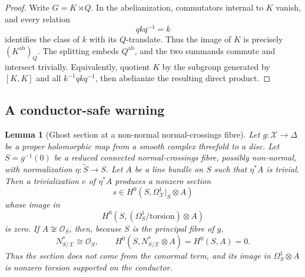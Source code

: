 \documentclass[11pt,reqno]{amsart}
\numberwithin{equation}{section}
\newtheorem{lemma}[lemma]{Lemma}
\theoremstyle{definition}
\begin{document}
\begin{proof}
Write $G=K\rtimes Q$. In the abelianization, commutators internal to $K$ vanish, and every relation
\[
qkq^{-1}=k
\]
identifies the class of $k$ with its $Q$-translate. Thus the image of $K$ is precisely $(K^{\mathrm{ab}})_Q$. The splitting embeds $Q^{\mathrm{ab}}$, and the two summands commute and intersect trivially. Equivalently, quotient $K$ by the subgroup generated by $[K,K]$ and all $k^{-1}qkq^{-1}$, then abelianize the resulting direct product.
\end{proof}

\subsection{A conductor-safe warning}

\begin{lemma}[Ghost section at a non-normal normal-crossings fibre]\label{lem:ghost}
Let $g:\mathcal X\to\Delta$ be a proper holomorphic map from a smooth complex threefold to a disc. Let $S=g^{-1}(0)$ be a reduced connected normal-crossings fibre, possibly non-normal, with normalization $\eta:\widetilde S\to S$. Let $A$ be a line bundle on $S$ such that $\eta^*A$ is trivial. Then a trivialization $e$ of $\eta^*A$ produces a nonzero section
\[
s\in H^0(S,\Omega^1_{\mathcal X}|_S\otimes A)
\]
whose image in
\[
H^0(S,(\Omega_S^1/\mathrm{torsion})\otimes A)
\]
is zero. If $A\not\cong\mathcal O_S$, then, because $S$ is the principal fibre of $g$,
\[
N^*_{S/\mathcal X}\cong\mathcal O_S,
\qquad
H^0(S,N^*_{S/\mathcal X}\otimes A)=H^0(S,A)=0.
\]
Thus the section does not come from the conormal term, and its image in $\Omega_S^1\otimes A$ is nonzero torsion supported on the conductor.
\end{lemma}
\end{document}
